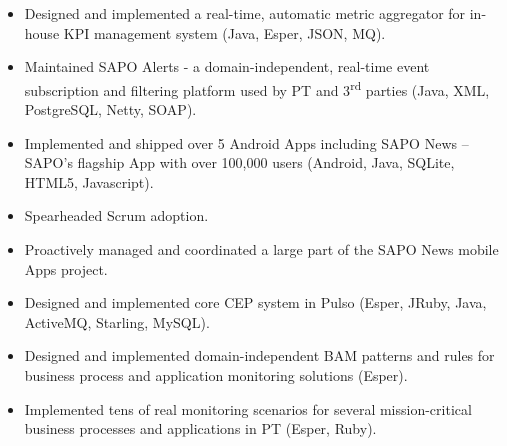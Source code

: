 \documentclass[a4paper,10pt]{scrartcl} %
\begin{document}
\begin{cv}{}


   {
  \begin{itemize}[nosep,noitemsep,leftmargin=3.85em]
    \item Designed and implemented a real-time, automatic metric aggregator for in-house KPI management system (Java, Esper, JSON, MQ).
    \item Maintained SAPO Alerts - a domain-independent, real-time event subscription and filtering platform used by PT and 3\textsuperscript{rd} parties (Java, XML, PostgreSQL, Netty, SOAP).
  \end{itemize}
  }

   {
  \begin{itemize}[nosep,noitemsep,leftmargin=3.85em]
    \item Implemented and shipped over 5 Android Apps including SAPO News -- SAPO's flagship App with over 100,000 users (Android, Java, SQLite, HTML5, Javascript).
    \item Spearheaded Scrum adoption.
    \item Proactively managed and coordinated a large part of the SAPO News mobile Apps project.
  \end{itemize}
  }

  \Sep




   {
  \begin{itemize}[nosep,noitemsep,leftmargin=3.85em]
    \item Designed and implemented core CEP system in Pulso (Esper, JRuby, Java, ActiveMQ, Starling, MySQL).
    \item Designed and implemented domain-independent BAM patterns and rules for business process and application monitoring solutions (Esper).
    \item Implemented tens of real monitoring scenarios for several mission-critical business processes and applications in PT (Esper, Ruby).
  \end{itemize}
  }


\end{cv}
\end{document}
